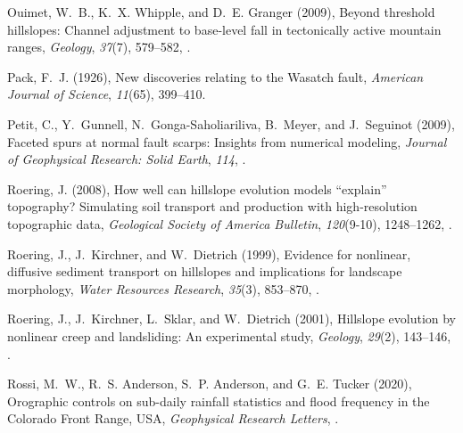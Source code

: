 \begin{thebibliography}{50}
Ouimet, W.~B., K.~X. Whipple, and D.~E. Granger (2009), Beyond threshold
  hillslopes: Channel adjustment to base-level fall in tectonically active
  mountain ranges, \textit{Geology}, \textit{37}(7), 579--582,
  .

Pack, F.~J. (1926), {New discoveries relating to the Wasatch fault},
  \textit{American Journal of Science}, \textit{11}(65), 399--410.

Petit, C., Y.~Gunnell, N.~Gonga-Saholiariliva, B.~Meyer, and J.~Seguinot
  ({2009}), {Faceted spurs at normal fault scarps: Insights from numerical
  modeling}, \textit{Journal of Geophysical Research: Solid Earth},
  \textit{{114}}, .

Roering, J. (2008), {How well can hillslope evolution models ``explain''
  topography? Simulating soil transport and production with high-resolution
  topographic data}, \textit{Geological Society of America Bulletin},
  \textit{120}(9-10), 1248--1262, .

Roering, J., J.~Kirchner, and W.~Dietrich ({1999}), {Evidence for nonlinear,
  diffusive sediment transport on hillslopes and implications for landscape
  morphology}, \textit{{Water Resources Research}}, \textit{{35}}({3}),
  {853--870}, .

Roering, J., J.~Kirchner, L.~Sklar, and W.~Dietrich ({2001}), {Hillslope
  evolution by nonlinear creep and landsliding: An experimental study},
  \textit{{Geology}}, \textit{{29}}({2}), {143--146},
  .

Rossi, M.~W., R.~S. Anderson, S.~P. Anderson, and G.~E. Tucker (2020),
  {Orographic controls on sub-daily rainfall statistics and flood frequency in
  the Colorado Front Range, USA}, \textit{Geophysical Research Letters},
  .


\end{thebibliography}
